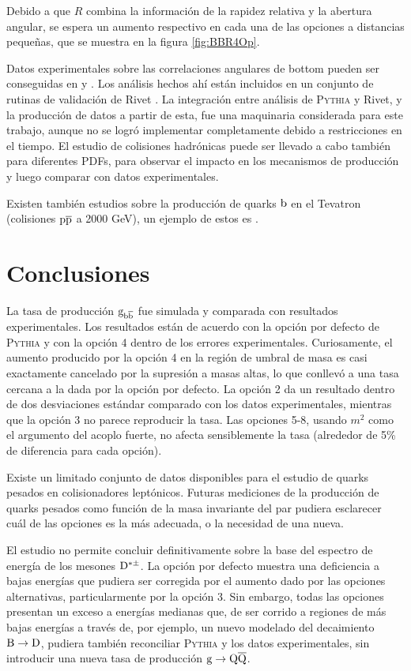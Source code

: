 \documentclass[a4paper,12pt]{article}
\begin{document}
Debido a que $R$ combina la información de la rapidez relativa y la abertura angular, se espera un aumento respectivo en cada una de las opciones a distancias pequeñas, que se muestra en la figura \ref{fig:BBR4Op}.

Datos experimentales sobre las correlaciones angulares de bottom pueden ser conseguidas en \cite{Khachatryan:2011wq} y \cite{ATLAS:2011ac}. Los análisis hechos ahí están incluidos en un conjunto de rutinas de validación de Rivet \cite{Buckley:2010ar}. La integración entre análisis de \textsc{Pythia} y Rivet, y la producción de datos a partir de esta, fue una maquinaria considerada para este trabajo, aunque no se logró implementar completamente debido a restricciones en el tiempo. El estudio de colisiones hadrónicas puede ser llevado a cabo también para diferentes PDFs, para observar el impacto en los mecanismos de producción y luego comparar con datos experimentales.

Existen también estudios sobre la producción de quarks ${\mathrm b}$ en el Tevatron (colisiones ${\mathrm p}\overline{\mathrm p}$ a 2000 GeV), un ejemplo de estos es \cite{vallecorsa}.

\section{Conclusiones}
\label{sec:summary}

La tasa de producción ${\mathrm g}_{{\mathrm b}\overline{\mathrm b}}$ fue simulada y comparada con resultados experimentales. Los resultados están de acuerdo con la opción por defecto de \textsc{Pythia} y con la opción 4 dentro de los errores experimentales. Curiosamente, el aumento producido por la opción 4 en la región de umbral de masa es casi exactamente cancelado por la supresión a masas altas, lo que conllevó a una tasa cercana a la dada por la opción por defecto. La opción 2 da un resultado dentro de dos desviaciones estándar comparado con los datos experimentales, mientras que la opción 3 no parece reproducir la tasa. Las opciones 5-8, usando $m^2$ como el argumento  del acoplo fuerte, no afecta sensiblemente la tasa (alrededor de 5\% de diferencia para cada opción).

Existe un limitado conjunto de datos disponibles para el estudio de quarks pesados en colisionadores leptónicos. Futuras mediciones de la producción de quarks pesados como función de la masa invariante del par pudiera esclarecer cuál de las opciones es la más adecuada, o la necesidad de una nueva.

El estudio no permite concluir definitivamente sobre la base del espectro de energía de los mesones ${\mathrm D}^{*\pm}$. La opción por defecto muestra una deficiencia a bajas energías que pudiera ser corregida por el aumento dado por las opciones alternativas, particularmente por la opción 3. Sin embargo, todas las opciones presentan un exceso a energías medianas que, de ser corrido a regiones de más bajas energías a través de, por ejemplo, un nuevo modelado del decaimiento ${\mathrm B}\to{\mathrm D}$, pudiera también reconciliar \textsc{Pythia} y los datos experimentales, sin introducir una nueva tasa de producción ${\mathrm g}\to{\mathrm Q}\overline{\mathrm Q}$.
\end{document}
